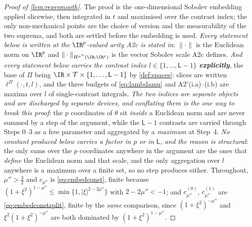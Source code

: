 \begin{proof}[Proof of \cref{lem:reprsmooth}]
The proof is the one-dimensional Sobolev embedding applied slicewise, then integrated in $t$ and
maximised over the contrast index; the only
non-mechanical points are the choice of version and the measurability of the two suprema, and both are
settled before the embedding is used. \emph{Every statement below is written at the $\IR^{p}$-valued
arity A2c is stated in}: $\|\cdot\|$ is the Euclidean norm on $\IR^{p}$ and $\|\cdot\|_{H^{\mu''}(\IR;\IR^{p})}$
is the vector Sobolev scale A2c defines. \emph{And every statement below carries the contrast index
$l\in\{1,\dots,\mathsf L-1\}$ \textbf{explicitly}}, the base of $\Pi$ being
$\IR\times\mathcal T\times\{1,\dots,\mathsf L-1\}$ by \cref{def:spaces}: slices are written
$\ell^\Pi(\cdot,t,l)$, and the three budgets of \eqref{eq:lambdamu} and A$2'$(i.a)--(i.b) are maxima
over $l$ of single-contrast integrals.
\emph{The two indices are separate objects and are discharged by separate devices, and conflating them
is the one way to break this proof}: the $p$ coordinates of $\theta$ sit \emph{inside} a Euclidean norm
and are never summed by a step of the argument, while the $\mathsf L-1$ contrasts are carried through
Steps 0--3 as a free parameter and aggregated by a \emph{maximum} at Step~4.
\emph{No constant produced below carries a factor in $p$ or in $\mathsf L$, and
the reason is structural}: the only sums over the $p$ coordinates anywhere in the argument are the ones
that \emph{define} the Euclidean norm and that scale, and the only aggregation over $l$ anywhere is a
maximum over a finite set, so no step produces either. Throughout, $\mu''>\tfrac32$ and
$c_{\mu''}$ is \eqref{eq:embedconst}, finite because $(1+\xi^{2})^{1-\mu''}\le\min\{1,|\xi|^{2-2\mu''}\}$
with $2-2\mu''<-1$; and $c^{(0)}_{\mu''}$, $c^{(1)}_{\mu''}$ are \eqref{eq:embedconstsplit}, finite by
the \emph{same} comparison, since $(1+\xi^{2})^{-\mu''}$ and $\xi^{2}(1+\xi^{2})^{-\mu''}$ are both
dominated by $(1+\xi^{2})^{1-\mu''}$.


\end{proof}
